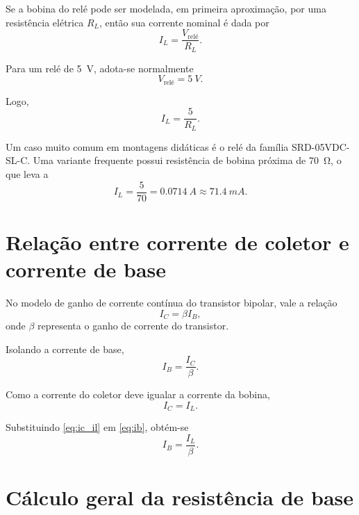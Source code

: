 \documentclass[12pt,a4paper]{article}
\newcommand{\Ic}{I_C}
\newcommand{\Ib}{I_B}
\newcommand{\Il}{I_L}
\newcommand{\Rl}{R_L}
\begin{document}
Se a bobina do relé pode ser modelada, em primeira aproximação, por uma resistência elétrica $\Rl$, então sua corrente nominal é dada por
\begin{equation}
\Il = \frac{V_{\text{relé}}}{\Rl}.
\label{eq:il}
\end{equation}

Para um relé de \SI{5}{V}, adota-se normalmente
\begin{equation}
V_{\text{relé}} = \SI{5}{V}.
\end{equation}

Logo,
\begin{equation}
\Il = \frac{5}{\Rl}.
\end{equation}

Um caso muito comum em montagens didáticas é o relé da família SRD-05VDC-SL-C. Uma variante frequente possui resistência de bobina próxima de \SI{70}{\ohm}, o que leva a
\begin{equation}
\Il = \frac{5}{70} = \SI{0,0714}{A} \approx \SI{71,4}{mA}.
\label{eq:il_srd_70}
\end{equation}

\section{Relação entre corrente de coletor e corrente de base}

No modelo de ganho de corrente contínua do transistor bipolar, vale a relação
\begin{equation}
\Ic = \beta\Ib,
\label{eq:ic_beta_ib}
\end{equation}
onde $\beta$ representa o ganho de corrente do transistor.

Isolando a corrente de base,
\begin{equation}
\Ib = \frac{\Ic}{\beta}.
\label{eq:ib}
\end{equation}

Como a corrente do coletor deve igualar a corrente da bobina,
\begin{equation}
\Ic = \Il.
\label{eq:ic_il}
\end{equation}

Substituindo \eqref{eq:ic_il} em \eqref{eq:ib}, obtém-se
\begin{equation}
\Ib = \frac{\Il}{\beta}.
\label{eq:ib_il_beta}
\end{equation}

\section{Cálculo geral da resistência de base}
\end{document}

